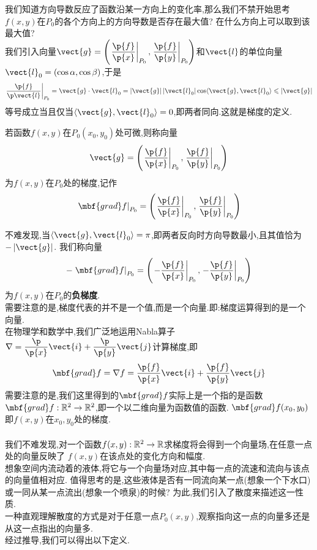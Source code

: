 \documentclass{ctexart}
\begin{document}
我们知道方向导数反应了函数沿某一方向上的变化率,那么我们不禁开始思考$f(x,y)$在$P_0$的各个方向上的方向导数是否存在最大值?
在什么方向上可以取到该最大值?\\
我们引入向量$\vect{g}=\left(\left.\dfrac{\p{f}}{\p{x}}\right|_{P_0},\left.\dfrac{\p{f}}{\p{y}}\right|_{P_0}\right)$和$\vect{l}$的单位向量$\vect{l}_0=(\cos\alpha,\cos\beta)$,于是
$$\left.\dfrac{\p{f}}{\p\vect{l}}\right|_{P_0}=\vect{g}\cdot\vect{l}_0=\left|\vect{g}\right|\left|\vect{l}_0\right|\cos\langle\vect{g},\vect{l}_0\rangle\leqslant\left|\vect{g}\right|$$
等号成立当且仅当$\langle\vect{g},\vect{l}_0\rangle=0$,即两者同向.这就是梯度的定义.
\begin{formal}
    若函数$f(x,y)$在$P_0(x_0,y_0)$处可微,则称向量
    $$\vect{g}=\left(\left.\dfrac{\p{f}}{\p{x}}\right|_{P_0},\left.\dfrac{\p{f}}{\p{y}}\right|_{P_0}\right)$$
    为$f(x,y)$在$P_0$处的梯度,记作
    $$\left.\mbf{grad}f\right|_{P_0}=\left(\left.\dfrac{\p{f}}{\p{x}}\right|_{P_0},\left.\dfrac{\p{f}}{\p{y}}\right|_{P_0}\right)$$
\end{formal}\noindent
不难发现,当$\langle\vect{g},\vect{l}_0\rangle=\pi$,即两者反向时方向导数最小,且其值恰为$-\left|\vect{g}\right|$.
我们称向量$$-\left.\mbf{grad}f\right|_{P_0}=\left(\left.-\dfrac{\p{f}}{\p{x}}\right|_{P_0},\left.-\dfrac{\p{f}}{\p{y}}\right|_{P_0}\right)$$
为$f(x,y)$在$P_0$的\textbf{\songti 负梯度}.\\
需要注意的是,梯度代表的并不是一个值,而是一个向量.即:梯度运算得到的是一个向量.\\
在物理学和数学中,我们广泛地运用Nabla算子$\nabla=\dfrac{\p}{\p{x}}\vect{i}+\dfrac{\p}{\p{y}}\vect{j}$计算梯度,即
$$\mbf{grad}f=\nabla{f}=\dfrac{\p{f}}{\p{x}}\vect{i}+\dfrac{\p{f}}{\p{y}}\vect{j}$$
需要注意的是,我们这里得到的$\mbf{grad}f$实际上是一个指的是函数$\mbf{grad}f:\R^2\to\R^2$,即一个以二维向量为函数值的函数.
$\mbf{grad}f(x_0,y_0)$即$f(x,y)$在$x_0,y_0$处的梯度.\\
\\
我们不难发现,对一个函数$f(x,y):\mathbb{R}^2\to\mathbb{R}$求梯度将会得到一个向量场,在任意一点处的向量反映了
$f(x,y)$在该点处的变化方向和幅度.\\
想象空间内流动着的液体,将它与一个向量场对应,其中每一点的流速和流向与该点的向量值相对应.
值得思考的是,这些液体是否有一同流向某一点(想象一个下水口)或一同从某一点流出(想象一个喷泉)的时候?
为此,我们引入了散度来描述这一性质.\\
一种直观理解散度的方式是对于任意一点$P_0(x,y)$,观察指向这一点的向量多还是从这一点指出的向量多.\\
经过推导,我们可以得出以下定义.
\end{document}
